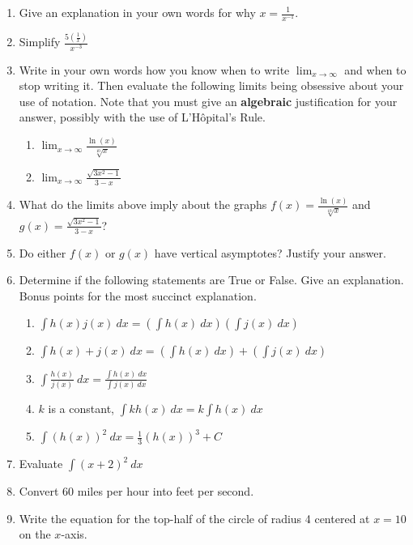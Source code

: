 \documentclass[12pt]{article}
\newcommand{\ds}{\displaystyle}
\begin{document}
\begin{enumerate}
\item Give an explanation in your own words for why $x=\frac{1}{x^{-1}}.$\\
\vspace{.5in}

\item Simplify $\ds \frac{5 \left(\frac{1}{x}\right)}{x^{-3}}$\\
\vspace{.5in}

\item Write in your own words how you know when to write $\lim_{x \to \infty}$ and when to stop writing it. Then evaluate the following limits being obsessive about your use of notation. Note that you must give an \textbf{algebraic} justification for your answer, possibly with the use of L'H\^{o}pital's Rule.\\
\vspace{1in}
\begin{enumerate}
	\item $\displaystyle{\lim_{x \to \infty} \frac{\ln (x)}{\sqrt[10]{x}}}$\\
	\vfill
	\item $\displaystyle{\lim_{x \to \infty} \frac{\sqrt{3x^2-1}}{3-x}}$\\
	\vfill
\end{enumerate}
\item What do the limits above imply about the graphs $f(x) = \frac{\ln (x)}{\sqrt[10]{x}}$ and $g(x) = \frac{\sqrt{3x^2-1}}{3-x}$?
\vfill
\item Do either $f(x)$ or $g(x)$ have vertical asymptotes? Justify your answer.
\vfill
\newpage
\item Determine if the following statements are True or False. Give an explanation. Bonus points for the most succinct explanation.
	\begin{enumerate}
	\item $\displaystyle{\int h(x) j(x) \: dx = \left(\int h(x) \: dx \right) \left(\int j(x) \: dx \right)}$
	\vfill
	\item $\displaystyle{\int h(x) +j(x) \: dx = \left(\int h(x) \: dx \right) +\left(\int j(x) \: dx \right)}$
	\vfill
	\item $\displaystyle{\int \frac{h(x)}{j(x)} \: dx = \frac{\int h(x) \: dx}{ \int j(x) \: dx }}$
	\vfill
	\item $k$ is a constant, $\displaystyle{\int kh(x) \: dx = k\int h(x) \: dx}$
	\vfill
	\item $\displaystyle{\int (h(x))^2 \: dx = \frac{1}{3}(h(x))^3 +C}$
	\vfill
	\end{enumerate}
\item Evaluate $\int (x+2)^2 \: dx$
\vfill
\item Convert 60 miles per hour into feet per second. 
\vfill
\item Write the equation for the top-half of the circle of radius 4 centered at $x=10$ on the $x$-axis.
\vfill
\end{enumerate}
\end{document}
